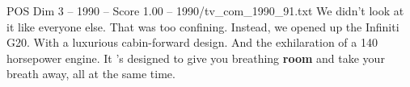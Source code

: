 \begin{textsample}{POS Dim 3 – 1990 – Score 1.00 – 1990/tv\_com\_1990\_91.txt}  \label{ex:f3_pos_080}
We didn't look at it like everyone else.
That was too confining.
Instead, we opened up the Infiniti G20.
With a luxurious cabin-forward design.
And the exhilaration of a 140 horsepower engine.
It 's designed to give you breathing \textbf{room} and take your breath away, all at the same time.

\end{textsample}
